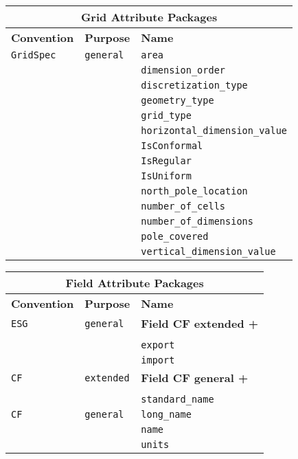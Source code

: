 \vspace{18pt}

\begin{tabular}{|p{4cm}|p{4cm}|p{6cm}|}
\hline
\multicolumn{3}{|c|}{{\bf \large Grid Attribute Packages}} \\
\hline\hline
{\bf Convention} & {\bf Purpose} & {\bf Name} \\
\hline\hline
{\tt GridSpec} & {\tt general} & {\tt area}  \\
 & & {\tt dimension\_order} \\ 
 & & {\tt discretization\_type} \\ 
 & & {\tt geometry\_type} \\ 
 & & {\tt grid\_type} \\ 
 & & {\tt horizontal\_dimension\_value} \\ 
 & & {\tt IsConformal} \\ 
 & & {\tt IsRegular} \\ 
 & & {\tt IsUniform} \\ 
 & & {\tt north\_pole\_location} \\ 
 & & {\tt number\_of\_cells} \\ 
 & & {\tt number\_of\_dimensions} \\ 
 & & {\tt pole\_covered} \\ 
 & & {\tt vertical\_dimension\_value} \\ 
\hline
\end{tabular}
\label{GridAttributePackages}

\vspace{18pt}

\begin{tabular}{|p{4cm}|p{4cm}|p{6cm}|}
\hline
\multicolumn{3}{|c|}{{\bf \large Field Attribute Packages}} \\
\hline\hline
{\bf Convention} & {\bf Purpose} & {\bf Name} \\
\hline\hline
{\tt ESG} & {\tt general} & {\bf Field CF extended +} \\
& & \\
& & {\tt export}  \\
 & & {\tt import} \\ 
\hline
{\tt CF} & {\tt extended} & {\bf Field CF general +} \\
& & \\
& & {\tt standard\_name}\\ 
\hline
{\tt CF} & {\tt general} & {\tt long\_name}\\
     & & {\tt name} \\
     & & {\tt units}  \\
\hline
\end{tabular}
\label{FieldAttributePackages}

